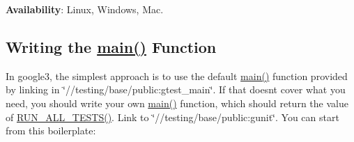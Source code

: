 {\bfseries{Availability}}\+: Linux, Windows, Mac.

\subsection*{Writing the \mbox{\hyperlink{_be_01vektoriaus_2main_8cpp_ae66f6b31b5ad750f1fe042a706a4e3d4}{main()}} Function}

In {\ttfamily google3}, the simplest approach is to use the default \mbox{\hyperlink{_be_01vektoriaus_2main_8cpp_ae66f6b31b5ad750f1fe042a706a4e3d4}{main()}} function provided by linking in {\ttfamily \char`\"{}//testing/base/public\+:gtest\+\_\+main\char`\"{}}. If that doesn\textquotesingle{}t cover what you need, you should write your own \mbox{\hyperlink{_be_01vektoriaus_2main_8cpp_ae66f6b31b5ad750f1fe042a706a4e3d4}{main()}} function, which should return the value of {\ttfamily \mbox{\hyperlink{googletest-master_2googletest_2include_2gtest_2gtest_8h_a853a3792807489591d3d4a2f2ff9359f}{R\+U\+N\+\_\+\+A\+L\+L\+\_\+\+T\+E\+S\+T\+S()}}}. Link to {\ttfamily \char`\"{}//testing/base/public\+:gunit\char`\"{}}. You can start from this boilerplate\+:


